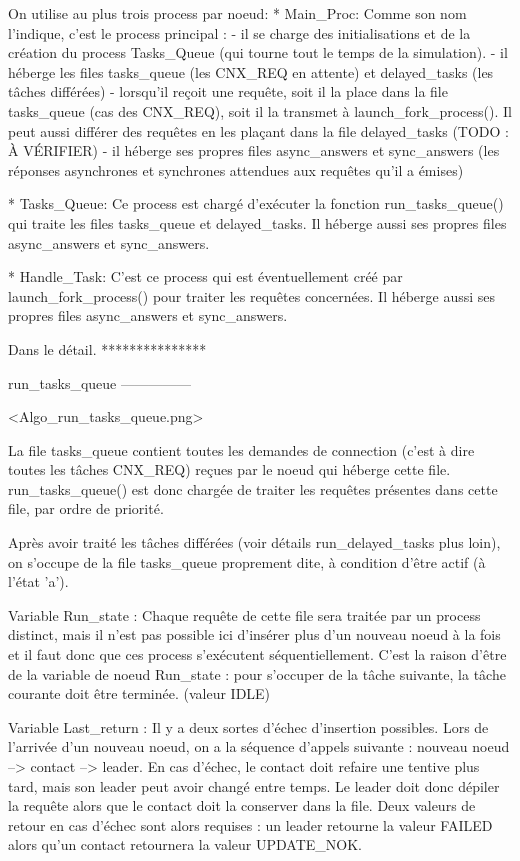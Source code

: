 On utilise au plus trois process par noeud:
    * Main_Proc:
      Comme son nom l'indique, c'est le process principal :
        - il se charge des initialisations et de la création du process Tasks_Queue (qui tourne
          tout le temps de la simulation).
        - il héberge les files tasks_queue (les CNX_REQ en attente) et delayed_tasks (les tâches
          différées)
        - lorsqu'il reçoit une requête, soit il la place dans la file tasks_queue (cas des
          CNX_REQ), soit il la transmet à launch_fork_process(). Il peut aussi différer des requêtes
          en les plaçant dans la file delayed_tasks (TODO : À VÉRIFIER)
        - il héberge ses propres files async_answers et sync_answers (les réponses asynchrones et
          synchrones attendues aux requêtes qu'il a émises)

    * Tasks_Queue:
      Ce process est chargé d'exécuter la fonction run_tasks_queue() qui traite les files
      tasks_queue et delayed_tasks.
      Il héberge aussi ses propres files async_answers et sync_answers.

    * Handle_Task:
      C'est ce process qui est éventuellement créé par launch_fork_process() pour traiter les
      requêtes concernées.
      Il héberge aussi ses propres files async_answers et sync_answers.

Dans le détail.
***************

run_tasks_queue
---------------

<Algo_run_tasks_queue.png>

La file tasks_queue contient toutes les demandes de connection (c'est à dire toutes les tâches
CNX_REQ) reçues par le noeud qui héberge cette file. run_tasks_queue() est donc chargée de traiter
les requêtes présentes dans cette file, par ordre de priorité.

Après avoir traité les tâches différées (voir détails run_delayed_tasks plus loin), on s'occupe de
la file tasks_queue proprement dite, à condition d'être actif (à l'état 'a').

Variable Run_state :
Chaque requête de cette file sera traitée par un process distinct, mais il n'est pas possible ici
d'insérer plus d'un nouveau noeud à la fois et il faut donc que ces process s'exécutent
séquentiellement. C'est la raison d'être de la variable de noeud Run_state : pour s'occuper de la
tâche suivante, la tâche courante doit être terminée. (valeur IDLE)

Variable Last_return :
Il y a deux sortes d'échec d'insertion possibles.
Lors de l'arrivée d'un nouveau noeud, on a la séquence d'appels suivante : nouveau noeud -->
contact --> leader. En cas d'échec, le contact doit refaire une tentive plus tard, mais son leader
peut avoir changé entre temps. Le leader doit donc dépiler la requête alors que le contact doit la
conserver dans la file. Deux valeurs de retour en cas d'échec sont alors requises : un leader
retourne la valeur FAILED alors qu'un contact retournera la valeur UPDATE_NOK.

